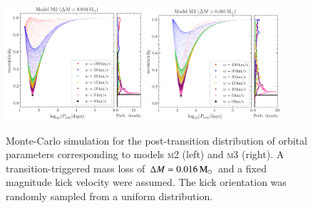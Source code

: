 \documentclass[main.tex]{subfiles}
\begin{document}
    \begin{figure}[t]
        \centering
        \includegraphics[width=0.45\textwidth]{figures/chapter4/mc_sim_m2.png}
        \hspace{1cm}
        \includegraphics[width=0.45\textwidth]{figures/chapter4/mc_sim_m3.png}
        \caption{Monte-Carlo simulation for the post-transition distribution of orbital parameters corresponding to models \textsc{m2} (left) and \textsc{m3} (right). A transition-triggered mass loss of $\Delta M = 0.016\mathrm{\,M_\odot}$ and a fixed magnitude kick velocity were assumed. The kick orientation was randomly sampled from a uniform distribution.}
        \label{fig:mc_sim}
    \end{figure}
    
    
    
\end{document}
